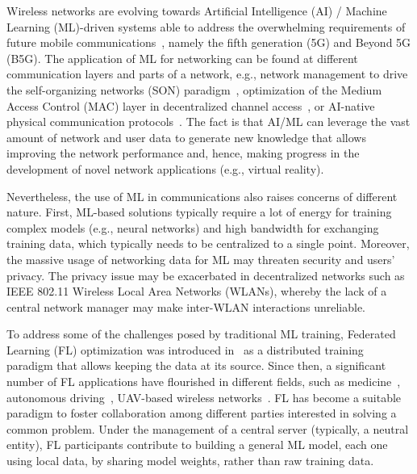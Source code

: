 \documentclass[10pt,a4paper,twocolumn]{article}
\newcommand{\ITUpar}{\vspace{8pt}\par}
\begin{document}
Wireless networks are evolving towards Artificial Intelligence (AI) / Machine Learning (ML)-driven systems able to address the overwhelming requirements of future mobile communications~\cite{morocho2019machine,akhtar2020shift}, namely the fifth generation (5G) and Beyond 5G (B5G). The application of ML for networking can be found at different communication layers and parts of a network, e.g., network management to drive the self-organizing networks (SON) paradigm~\cite{klaine2017survey}, optimization of the Medium Access Control (MAC) layer in decentralized channel access~\cite{bkassiny2012survey}, or AI-native physical communication protocols~\cite{oshea2017introduction,hoydis2021toward}. The fact is that AI/ML can leverage the vast amount of network and user data to generate new knowledge that allows improving the network performance and, hence, making progress in the development of novel network applications (e.g., virtual reality).\ITUpar

Nevertheless, the use of ML in communications also raises concerns of different nature. First, ML-based solutions typically require a lot of energy for training complex models (e.g., neural networks) and high bandwidth for exchanging training data, which typically needs to be centralized to a single point. Moreover, the massive usage of networking data for ML may threaten security and users' privacy. The privacy issue may be exacerbated in decentralized networks such as IEEE 802.11 Wireless Local Area Networks (WLANs), whereby the lack of a central network manager may make inter-WLAN interactions unreliable.\ITUpar 

To address some of the challenges posed by traditional ML training, Federated Learning (FL) optimization was introduced in~\cite{federated1} as a distributed training paradigm that allows keeping the data at its source. Since then, a significant number of FL applications have flourished in different fields, such as medicine~\cite{federated2}, autonomous driving~\cite{federated3}, UAV-based wireless networks~\cite{federated4}. FL has become a suitable paradigm to foster collaboration among different parties interested in solving a common problem. Under the management of a central server (typically, a neutral entity), FL participants contribute to building a general ML model, each one using local data, by sharing model weights, rather than raw training data.\ITUpar
\end{document}

